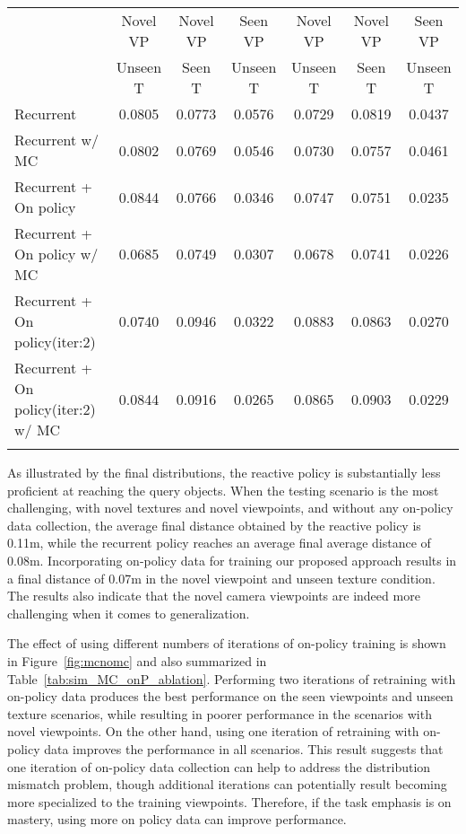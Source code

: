 \documentclass[10pt,twocolumn,letterpaper]{article}
\begin{document}
\begin{table*}
\begin{small}
\begin{center}
\begin{tabular}[10pt]{lcccccc}
 &{Novel VP} & {Novel VP} & {Seen VP} &{Novel VP} & {Novel VP} & {Seen VP} \\
  & {Unseen T} & {Seen T } & {Unseen T } & {Unseen T} & {Seen T } & {Unseen T } \\
\midrule{Recurrent}                                       & {0.0805} & {0.0773}& {0.0576} & {0.0729} & {0.0819} & {0.0437} \\
{Recurrent w/ MC}                             & {0.0802} & {0.0769}& {0.0546} & {0.0730} & {0.0757} & {0.0461} \\
{Recurrent + On policy}                      & {0.0844} & {0.0766}& {0.0346} & {0.0747} & {0.0751} & {0.0235} \\
{Recurrent + On policy w/ MC}            & {0.0685} & {0.0749}& {0.0307} & {0.0678} & {0.0741} & {0.0226} \\
{Recurrent + On policy(iter:2)}            & {0.0740} & {0.0946}& {0.0322} & {0.0883} & {0.0863} & {0.0270} \\
{Recurrent + On policy(iter:2) w/ MC}  & {0.0844} & {0.0916}& {0.0265} & {0.0865} & {0.0903} & {0.0229} \\

\bottomrule
\vspace{-.2in}
\end{tabular}
\end{center}
\end{small}
\end{table*} As illustrated by the final distributions, the reactive policy is substantially less proficient at reaching the query objects. When the testing scenario is the most challenging, with novel textures and novel viewpoints, and without any on-policy data collection, the average final distance obtained by the reactive policy is 0.11m, while the recurrent policy reaches an average final average distance of 0.08m. Incorporating on-policy data for training our proposed approach results in a final distance of 0.07m in the novel viewpoint and unseen texture condition. The results also indicate that the novel camera viewpoints are indeed more challenging when it comes to generalization.

The effect of using different numbers of iterations of on-policy training is shown in Figure~\ref{fig:mcnomc} and also summarized in Table~\ref{tab:sim_MC_onP_ablation}. Performing two iterations of retraining with on-policy data produces the best performance on the seen viewpoints and unseen texture scenarios, while resulting in poorer performance in the scenarios with novel viewpoints. On the other hand, using one iteration of retraining with on-policy data improves the performance in all scenarios. This result suggests that one iteration of on-policy data collection can help to address the distribution mismatch problem, though additional iterations can potentially result becoming more specialized to the training viewpoints. Therefore, if the task emphasis is on mastery, using more on policy data can improve performance.
\end{document}
